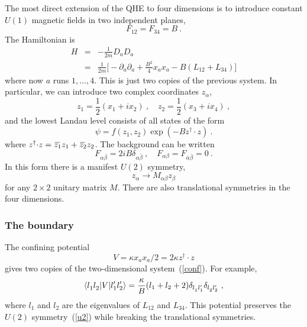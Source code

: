 \documentclass[a4paper,12pt]{article}
\newcommand{\OL}[1]{ \hspace{1pt}\overline{\hspace{-1pt}#1
   \hspace{-2pt}}\hspace{2pt} }
\begin{document}
The most direct extension of the QHE to four dimensions is to introduce
constant
$U(1)$ magnetic fields in two independent planes,
\begin{equation} 
F_{12} = F_{34} = B\ .
\end{equation}
The Hamiltonian is
\begin{eqnarray}
H &=& -\frac{1}{2m} D_a D_a \nonumber\\
&=& \frac{1}{2m} \biggl[ -\partial_a \partial_a + \frac{B^2}{4} x_a
x_a - B (L_{12} + L_{34}) \biggr]  \label{abfor}
\end{eqnarray}
where now $a$ runs $1,\ldots,4$.
This is just two copies of the previous system.  In particular, we can
introduce two complex coordinates $z_\alpha$,
\begin{equation}
z_1 =  \frac{1}{2}(x_1 + i x_2)\ , \quad z_2 =  \frac{1}{2}(x_3 + i x_4)\ ,
\end{equation}
and the lowest Landau level consists of all states of the form 
\begin{equation}
\psi = f(z_1,z_2) \exp(-B z^\dagger{\cdot} z )\ .
\end{equation}
where $z^\dagger{\cdot} z = \OL{z_1}z_1 + 
\OL{z_2}z_2$.  The background can be written
\begin{equation}
F_{\alpha\bar\beta} = 2iB\delta_{\alpha\bar\beta}\ ,\quad F_{\alpha\beta} =
F_{\bar\alpha\bar\beta} = 0\ .
\end{equation}
In this form there is a manifest $U(2)$ symmetry,
\begin{equation}
z_{\alpha} \to M_{\alpha \beta} z_\beta
\label{u2}
\end{equation}
for any $2\times 2$ unitary matrix $M$.  There are also translational
symmetries in the four dimensions.

\subsubsection{The boundary}

The confining potential 
\begin{equation}
V = \kappa x_a x_a / 2 = {2\kappa} z^\dagger{\cdot} z
\label{confour}
\end{equation}
gives two copies of the two-dimensional system~(\ref{conf}).  For example,
\begin{equation}
\langle l^{\vphantom\prime}_1 l^{\vphantom\prime}_2 | V | l_1' l_2'\rangle
=
\frac{\kappa}{B} (l_1 + l_2 +2)
\delta_{l^{\vphantom\prime}_1 l_1'}
\delta_{l^{\vphantom\prime}_2 l_2'}\ ,
\end{equation}
where $l_1$ and $l_2$ are the eigenvalues of $L_{12}$ and $L_{34}$.  This
potential preserves the $U(2)$ symmetry~(\ref{u2}) while breaking the
translational symmetries.
\end{document}

